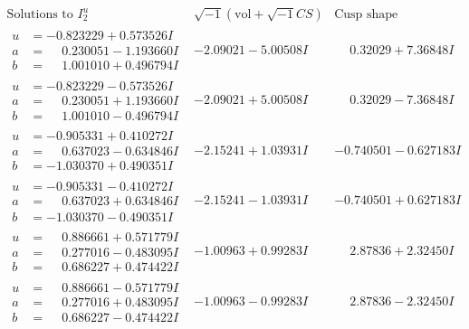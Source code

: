 \documentclass[1p]{elsarticle_modified}
\theoremstyle{definition}
\newcommand{\I}{\sqrt{-1}}
\begin{document}
$$\begin{array}{c|c|c}  
\text{Solutions to }I^u_{2}& \I (\text{vol} + \sqrt{-1}CS) & \text{Cusp shape}\\
 \hline 
\begin{aligned}
u &= -0.823229 + 0.573526 I \\
a &= \phantom{-}0.230051 - 1.193660 I \\
b &= \phantom{-}1.001010 + 0.496794 I\end{aligned}
 & -2.09021 - 5.00508 I & \phantom{-}0.32029 + 7.36848 I \\ \hline\begin{aligned}
u &= -0.823229 - 0.573526 I \\
a &= \phantom{-}0.230051 + 1.193660 I \\
b &= \phantom{-}1.001010 - 0.496794 I\end{aligned}
 & -2.09021 + 5.00508 I & \phantom{-}0.32029 - 7.36848 I \\ \hline\begin{aligned}
u &= -0.905331 + 0.410272 I \\
a &= \phantom{-}0.637023 - 0.634846 I \\
b &= -1.030370 + 0.490351 I\end{aligned}
 & -2.15241 + 1.03931 I & -0.740501 - 0.627183 I \\ \hline\begin{aligned}
u &= -0.905331 - 0.410272 I \\
a &= \phantom{-}0.637023 + 0.634846 I \\
b &= -1.030370 - 0.490351 I\end{aligned}
 & -2.15241 - 1.03931 I & -0.740501 + 0.627183 I \\ \hline\begin{aligned}
u &= \phantom{-}0.886661 + 0.571779 I \\
a &= \phantom{-}0.277016 - 0.483095 I \\
b &= \phantom{-}0.686227 + 0.474422 I\end{aligned}
 & -1.00963 + 0.99283 I & \phantom{-}2.87836 + 2.32450 I \\ \hline\begin{aligned}
u &= \phantom{-}0.886661 - 0.571779 I \\
a &= \phantom{-}0.277016 + 0.483095 I \\
b &= \phantom{-}0.686227 - 0.474422 I\end{aligned}
 & -1.00963 - 0.99283 I & \phantom{-}2.87836 - 2.32450 I \\ \hline\begin{aligned}

\end{aligned}
\end{array}$$
\end{document}
